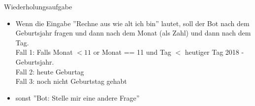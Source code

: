 \begin{frame}[fragile]{Wiederholungsaufgabe}

\begin{itemize}
	\item Wenn die Eingabe ''Rechne aus wie alt ich bin'' lautet, soll der Bot nach dem Geburtsjahr fragen und dann nach dem Monat (als Zahl) und dann nach dem Tag. \\Fall 1: Falls Monat $<11$ or Monat == 11 und Tag $<$ heutiger Tag 2018 - Geburtsjahr. \\
	Fall 2: heute Geburtag\\
	Fall 3: noch nicht Geburtstag gehabt
	\item sonst ''Bot: Stelle mir eine andere Frage'' 
	\end{itemize}
\end{frame}